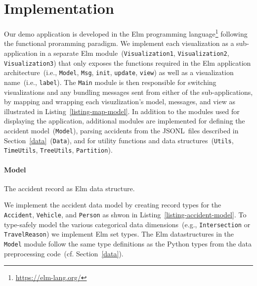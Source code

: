 \section{Implementation}
\label{implementation}
\begin{listing}
    
    \caption{Example of wrapping the \lstinline{update} function from \lstinline{Visualization1} inside the \lstinline{Main} module's \lstinline{update} function. Commands sent from \lstinline{Visualization1} are then mapped to the \lstinline{Main} modules types.}
    \label{listing-map-model}
\end{listing}
Our demo application is developed in the Elm programming language\footnote{\url{https://elm-lang.org/}} following the functional proramming paradigm. We implement each visualization as a sub-application in a separate Elm module~(\lstinline{Visualization1}, \lstinline{Visualization2}, \lstinline{Visualization3}) that only exposes the functions required in the Elm application architecture~(i.e., \lstinline{Model}, \lstinline{Msg}, \lstinline{init}, \lstinline{update}, \lstinline{view}) as well as a visualization name~(i.e., \lstinline{label}). The \lstinline{Main} module is then responsible for switching visualizations and any bundling messages sent from either of the sub-applications, by mapping and wrapping each visuzlization's model, messages, and view as illustrated in Listing~\ref{listing-map-model}. In addition to the modules used for displaying the application, additional modules are implemented for defining the accident model~(\lstinline{Model}), parsing accidents from the JSONL~files described in Section~\ref{data}~(\lstinline{Data}), and for utility functions and data structures~(\lstinline{Utils}, \lstinline{TimeUtils}, \lstinline{TreeUtils}, \lstinline{Partition}).

\paragraph{Model}
\begin{listing}
    
    \caption{The accident record as Elm data structure.}
    \label{listing-accident-model}
\end{listing}
We implement the accident data model by creating record types for the \lstinline{Accident}, \lstinline{Vehicle}, and \lstinline{Person} as shwon in Listing~\ref{listing-accident-model}. To type-safely model the various categorical data dimensions~(e.g., \lstinline{Intersection} or \lstinline{TravelReason}) we implement Elm set types. The Elm datastructures in the \lstinline{Model} module follow the same type definitions as the Python types from the data preprocessing code~(cf. Section~\ref{data}).

